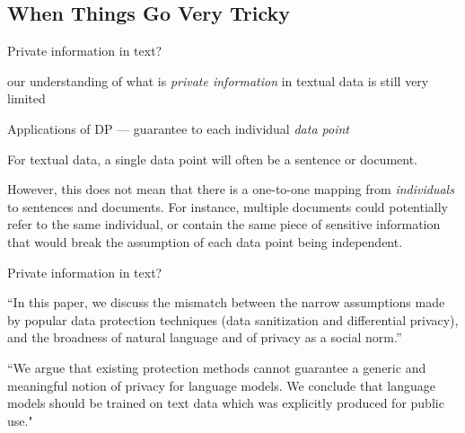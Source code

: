 \documentclass[12pt,aspectratio=169,handout]{beamer}
\begin{document}
\subsection{When Things Go Very Tricky}


\begin{frame}{Private information in text?}


our understanding of what is \textit{private information} in textual data is still very limited

Applications of DP --- guarantee to each individual \textit{data point}

For textual data, a single data point will often be a sentence or document.

However, this does not mean that there is a one-to-one mapping from \textit{individuals} to sentences and documents.
For instance, multiple documents could potentially refer to the same individual, or contain the same piece of sensitive information that would break the assumption of each data point being independent.


\end{frame}


\begin{frame}{Private information in text?}


``In this paper, we discuss the mismatch between the narrow assumptions made by popular data protection techniques (data sanitization and differential privacy), and the broadness of natural language and of privacy as a social norm.''


``We argue that existing protection methods cannot guarantee a generic and meaningful notion of privacy for language models. We conclude that language models should be trained on text data which was explicitly produced for public use."


\end{frame}
\end{document}
